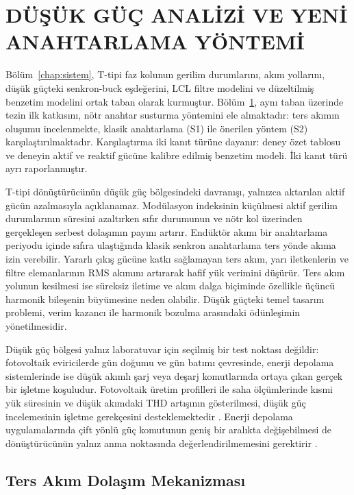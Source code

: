 \chapter{DÜŞÜK GÜÇ ANALİZİ VE YENİ ANAHTARLAMA YÖNTEMİ}
\label{chap:anahtarlama}

Bölüm~\ref{chap:sistem}, T-tipi faz kolunun gerilim durumlarını, akım yollarını, düşük güçteki senkron-buck eşdeğerini, LCL filtre modelini ve düzeltilmiş benzetim modelini ortak taban olarak kurmuştur. Bölüm~\ref{chap:anahtarlama}, aynı taban üzerinde tezin ilk katkısını, nötr anahtar susturma yöntemini ele almaktadır: ters akımın oluşumu incelenmekte, klasik anahtarlama (S1) ile önerilen yöntem (S2) karşılaştırılmaktadır. Karşılaştırma iki kanıt türüne dayanır: deney özet tablosu ve deneyin aktif ve reaktif gücüne kalibre edilmiş benzetim modeli. İki kanıt türü ayrı raporlanmıştır.

T-tipi dönüştürücünün düşük güç bölgesindeki davranışı, yalnızca aktarılan aktif gücün azalmasıyla açıklanamaz. Modülasyon indeksinin küçülmesi aktif gerilim durumlarının süresini azaltırken sıfır durumunun ve nötr kol üzerinden gerçekleşen serbest dolaşımın payını artırır. Endüktör akımı bir anahtarlama periyodu içinde sıfıra ulaştığında klasik senkron anahtarlama ters yönde akıma izin verebilir. Yararlı çıkış gücüne katkı sağlamayan ters akım, yarı iletkenlerin ve filtre elemanlarının RMS akımını artırarak hafif yük verimini düşürür. Ters akım yolunun kesilmesi ise süreksiz iletime ve akım dalga biçiminde özellikle üçüncü harmonik bileşenin büyümesine neden olabilir. Düşük güçteki temel tasarım problemi, verim kazancı ile harmonik bozulma arasındaki ödünleşimin yönetilmesidir.

Düşük güç bölgesi yalnız laboratuvar için seçilmiş bir test noktası değildir: fotovoltaik eviricilerde gün doğumu ve gün batımı çevresinde, enerji depolama sistemlerinde ise düşük akımlı şarj veya deşarj komutlarında ortaya çıkan gerçek bir işletme koşuludur. Fotovoltaik üretim profilleri ile saha ölçümlerinde kısmi yük süresinin ve düşük akımdaki THD artışının gösterilmesi, düşük güç incelemesinin işletme gerekçesini desteklemektedir \citep{Mondol2007,AbRahman2020,Chicco2009}. Enerji depolama uygulamalarında çift yönlü güç komutunun geniş bir aralıkta değişebilmesi de dönüştürücünün yalnız anma noktasında değerlendirilmemesini gerektirir \citep{Aneke2016}.

\section{Ters Akım Dolaşım Mekanizması}
\label{sec:ters-akim-mekanizmasi}

